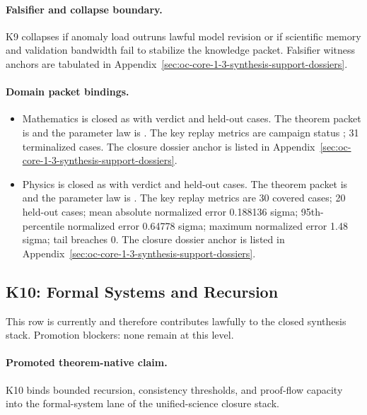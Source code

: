 \paragraph{Falsifier and collapse boundary.}
K9 collapses if anomaly load outruns lawful model revision or if scientific memory and validation bandwidth fail to stabilize the knowledge packet.
Falsifier witness anchors are tabulated in Appendix~\ref{sec:oc-core-1-3-synthesis-support-dossiers}.

\paragraph{Domain packet bindings.}
\begin{itemize}[leftmargin=1.6em,nosep]
\item Mathematics is closed as  with verdict  and  held-out cases. The theorem packet is  and the parameter law is . The key replay metrics are campaign status ; 31 terminalized cases. The closure dossier anchor is listed in Appendix~\ref{sec:oc-core-1-3-synthesis-support-dossiers}.
\item Physics is closed as  with verdict  and  held-out cases. The theorem packet is  and the parameter law is . The key replay metrics are 30 covered cases; 20 held-out cases; mean absolute normalized error 0.188136 sigma; 95th-percentile normalized error 0.64778 sigma; maximum normalized error 1.48 sigma; tail breaches 0. The closure dossier anchor is listed in Appendix~\ref{sec:oc-core-1-3-synthesis-support-dossiers}.
\end{itemize}

\subsection{K10: Formal Systems and Recursion}
\label{sec:oc-core-1-3-synthesis-k10}
This row is currently  and therefore contributes lawfully to the closed synthesis stack.
Promotion blockers: none remain at this level.

\paragraph{Promoted theorem-native claim.}
K10 binds bounded recursion, consistency thresholds, and proof-flow capacity into the formal-system lane of the unified-science closure stack.

